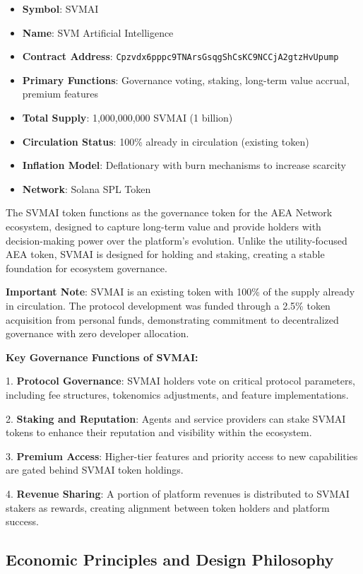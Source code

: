 \documentclass[12pt,a4paper]{article}
\begin{document}
\begin{itemize}
\item \textbf{Symbol}: SVMAI
\item \textbf{Name}: SVM Artificial Intelligence
\item \textbf{Contract Address}: \texttt{Cpzvdx6pppc9TNArsGsqgShCsKC9NCCjA2gtzHvUpump}
\item \textbf{Primary Functions}: Governance voting, staking, long-term value accrual, premium features
\item \textbf{Total Supply}: 1,000,000,000 SVMAI (1 billion)
\item \textbf{Circulation Status}: 100\% already in circulation (existing token)
\item \textbf{Inflation Model}: Deflationary with burn mechanisms to increase scarcity
\item \textbf{Network}: Solana SPL Token
\end{itemize}

The SVMAI token functions as the governance token for the AEA Network ecosystem, designed to capture long-term value and provide holders with decision-making power over the platform's evolution. Unlike the utility-focused AEA token, SVMAI is designed for holding and staking, creating a stable foundation for ecosystem governance.

\textbf{Important Note}: SVMAI is an existing token with 100\% of the supply already in circulation. The protocol development was funded through a 2.5\% token acquisition from personal funds, demonstrating commitment to decentralized governance with zero developer allocation.

\textbf{Key Governance Functions of SVMAI:}

1. \textbf{Protocol Governance}: SVMAI holders vote on critical protocol parameters, including fee structures, tokenomics adjustments, and feature implementations.

2. \textbf{Staking and Reputation}: Agents and service providers can stake SVMAI tokens to enhance their reputation and visibility within the ecosystem.

3. \textbf{Premium Access}: Higher-tier features and priority access to new capabilities are gated behind SVMAI token holdings.

4. \textbf{Revenue Sharing}: A portion of platform revenues is distributed to SVMAI stakers as rewards, creating alignment between token holders and platform success.

\subsection{Economic Principles and Design Philosophy}
\end{document}
